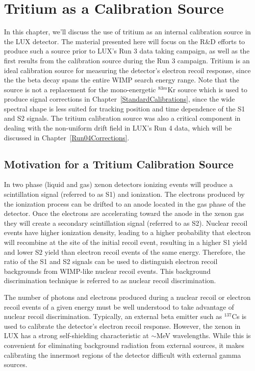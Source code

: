 \section{Tritium as a Calibration Source} \label{TritiumChapter}


In this chapter, we'll discuss the use of tritium as an internal calibration source in the LUX detector.  The material presented here will focus on the R\&D efforts to produce such a source prior to LUX's Run 3 data taking campaign, as well as the first results from the calibration source during the Run 3 campaign.  Tritium is an ideal calibration source for measuring the detector's electron recoil response, since the the beta decay spans the entire WIMP search energy range.  Note that the source is not a replacement for the mono-energetic $^{83m}$Kr source which is used to produce signal corrections in Chapter~\ref{StandardCalibrations}, since the wide spectral shape is less suited for tracking position and time dependence of the S1 and S2 signals.  The tritium calibration source was also a critical component in dealing with the non-uniform drift field in LUX's Run 4 data, which will be discussed in Chapter~\ref{Run04Corrections}.

\subsection{Motivation for a Tritium Calibration Source}

In two phase (liquid and gas) xenon detectors ionizing events will produce a scintillation signal (referred to as S1) and ionization. The electrons produced by the ionization process can be drifted to an anode located in the gas phase of the detector. Once the electrons are accelerating toward the anode in the xenon gas they will create a secondary scintillation signal (referred to as S2). Nuclear recoil events have higher ionization density, leading to a higher probability that electron will recombine at the site of the initial recoil event, resulting in a higher S1 yield and lower S2 yield than electron recoil events of the same energy. Therefore, the ratio of the S1 and S2 signals can be used to distinguish electron recoil backgrounds from WIMP-like nuclear recoil events.  This background discrimination technique is referred to as nuclear recoil discrimination.

The number of photons and electrons produced during a nuclear recoil or electron recoil events of a given energy must be well understood to take advantage of nuclear recoil discrimination.  Typically, an external beta emitter such as $^{137}$Cs is used to calibrate the detector's electron recoil response. However, the xenon in LUX has a strong self-shielding characteristic at $\sim$MeV wavelengths. While this is convenient for eliminating background radiation from external sources, it makes calibrating the innermost regions of the detector difficult with external gamma sources.

